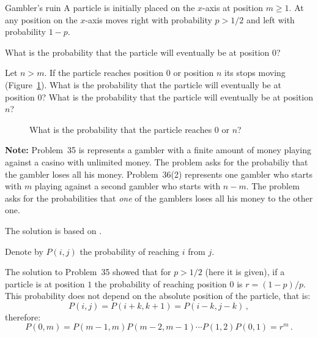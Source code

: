 \begin{prob}{Gambler's ruin}
A particle is initially placed on the $x$-axis at position $m\geq 1$. At any position on the $x$-axis moves right with probability $p>1/2$ and left with probability $1-p$.

 What is the probability that the particle will eventually be at position $0$?

 Let $n>m$. If the particle reaches position $0$ or position $n$ its stops moving (Figure~\ref{f.ruin3}). What is the probability that the particle will eventually be at position $0$? What is the probability that the particle will eventually be at position $n$?
\begin{figure}[tb]
\begin{center}
\end{center}
\caption{What is the probability that the particle reaches $0$ or $n$?}\label{f.ruin3}
\end{figure}

\textbf{Note:} Problem~35 is represents a gambler with a finite amount of money playing against a casino with unlimited money. The problem asks for the probabiliy that the gambler loses all his money. Problem~36(2) represents one gambler who starts with $m$ playing against a second gambler who starts with $n-m$. The problem asks for the probabilities that \emph{one} of the gamblers loses all his money to the other one.
\end{prob}

\solution{}

The solution is based on \cite[Chapter~3, Example~4m]{ross}.

Denote by $P(i,j)$ the probability of reaching $i$ from $j$.

 The solution to Problem~35 showed that for $p>1/2$ (here it is given), if a particle is at position $1$ the probability of reaching position $0$ is $r=(1-p)/p$. This probability does not depend on the absolute position of the particle, that is:
\[
P(i,j) = P(i+k,k+1) = P(i-k,j-k)\,,
\]
therefore:
\begin{equation}
P(0,m)=P(m-1,m)P(m-2,m-1)\cdots P(1,2)P(0,1)=r^m\,.
\end{equation}

